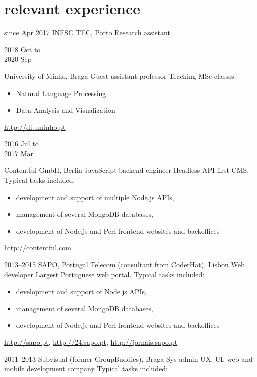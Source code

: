 \documentclass[a4paper]{friggeri-cv}
\begin{document}
\section{relevant experience}
\begin{entrylist}
  \entry
    {{\tiny since} Apr 2017}
    {INESC TEC, Porto}
    {Research assistant}
    {\vspace{-0.7cm}}
    {}
  \entry
    {\parbox[t][][t]{1.8cm}{2018 {\footnotesize Oct to}\\2020
    {\footnotesize Sep}}}
    {University of Minho, Braga}
    {Guest assistant professor}
    {Teaching MSc classes:}
    {\begin{itemize}
        \item Natural Language Processing
        \item Data Analysis and Visualization
    \end{itemize}
    \url{http://di.uminho.pt}
    }
  \entry
    {\parbox[t][][t]{1.8cm}{2016 {\footnotesize Jul to}\\2017 {\footnotesize Mar}}}
    {Contentful GmbH, Berlin}
    {JavaScript backend engineer}
    {Headless API-first CMS. \footnotesize{Typical tasks
    included:}}
    {\begin{itemize}
        \item development and support of multiple Node.js APIs,
        \item management of several MongoDB databases,
        \item development of Node.js and Perl frontend websites and backoffices
    \end{itemize}
    \url{http://contentful.com}
    }
  \entry
    {2013--2015}
    {SAPO, Portugal Telecom (consultant from \href{http://www.coderhat.com/}{CoderHat}), Lisbon}
    {Web developer}
    {Largest Portuguese web portal. \footnotesize{Typical tasks
    included:}}
    {\begin{itemize}
        \item development and support of Node.js APIs,
        \item management of several MongoDB databases,
        \item development of Node.js and Perl frontend websites and backoffices
    \end{itemize}
    \url{http://sapo.pt}, \url{http://24.sapo.pt}, \url{http://jornais.sapo.pt}
    }
  \entry
    {2011--2013}
    {Subvisual (former GroupBuddies), Braga}
    {Sys admin}
    {UX, UI, web and mobile development company}
    {Typical tasks included:
}
\end{entrylist}
\end{document}
